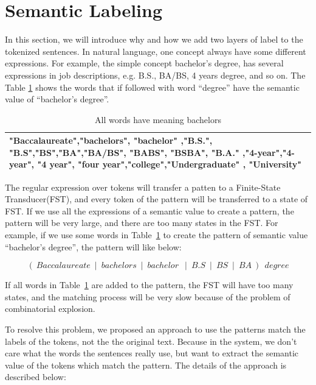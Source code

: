 \section{Semantic Labeling}

In this section, we will introduce why and how we add two layers of label to the tokenized sentences. In natural language, one concept always have some different expressions. For example, the simple concept bachelor's degree,  has several expressions in job descriptions, e.g. B.S., BA/BS, 4 years degree, and so on. The Table \ref{tab:multispelling} shows the words that if followed with word ``degree'' have the semantic value of ``bachelor's degree''.

\begin{table}[ht]
\caption{All words have meaning bachelors } %
\centering %
\begin{tabular}{  | p{15cm} |  }
 \hline
 "Baccalaureate","bachelors", "bachelor" ,"B.S.", "B.S","BS","BA","BA/BS", "BABS", "BSBA", "B.A." ,"4-year","4-year", "4 year", "four year","college","Undergraduate" , "University" \\
  \hline
\end{tabular}
\label{tab:multispelling} %
\end{table}

The regular expression over tokens will transfer a patten to a Finite-State Transducer(FST), and every token of the pattern will be transferred to a state of FST. If we use all the expressions of a semantic value to create a pattern, the pattern will be very large, and there are too many states in the FST. For example, if we use some words in Table~\ref{tab:multispelling} to create the pattern of semantic value ``bachelor's degree'', the pattern will like below:

$$ (~Baccalaureate~\mid~bachelors~\mid~bachelor~~\mid~B.S~\mid~BS~\mid~BA~)~~degree $$

If all words in Table~\ref{tab:multispelling} are added to the pattern, the FST will have too many states, and the matching process will be very slow because of the problem of combinatorial explosion.

To resolve this problem, we proposed an approach to use the patterns match the labels of the tokens, not the the original text. Because in the system, we don't care what the words the sentences really use, but want to extract the semantic value of the tokens which match the pattern. The details of the approach is described below:

